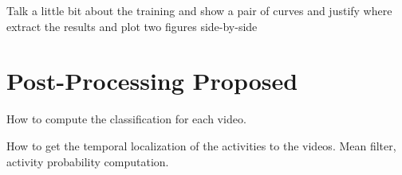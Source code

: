 Talk a little bit about the training and show a pair of curves and justify where extract the results and plot two figures side-by-side 

\section{Post-Processing Proposed}

How to compute the classification for each video.

How to get the temporal localization of the activities to the videos.
Mean filter, activity probability computation.
